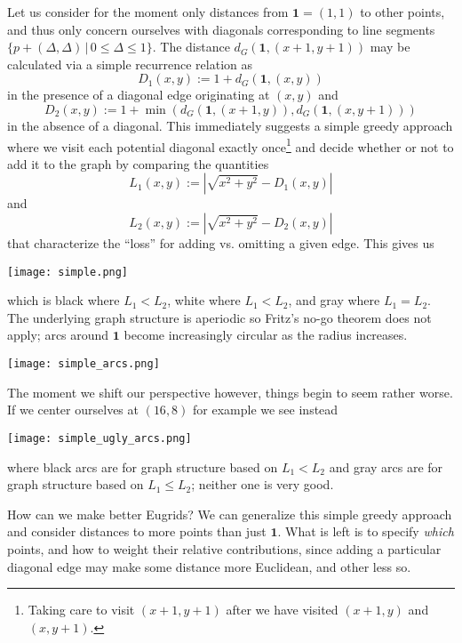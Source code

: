 \documentclass[letterpaper]{article}
\begin{document}
Let us consider for the moment only distances from $\mathbf{1} = (1, 1)$ to other points, and
thus only concern ourselves with diagonals corresponding to line segments $\{p + (\Delta,
\Delta) \, | \, 0 \leq \Delta \leq 1\}$. The distance $d_G(\mathbf{1}, (x+1, y+1))$ may be
calculated via a simple recurrence relation as
\begin{equation*}
  D_1(x, y) := 1 + d_G(\mathbf{1}, (x, y))
\end{equation*}
in the presence of a diagonal edge originating at $(x, y)$ and
\begin{equation*}
  D_2(x, y) := 1 + \min(d_G(\mathbf{1}, (x + 1, y)), d_G(\mathbf{1}, (x, y + 1)))
\end{equation*}
in the absence of a diagonal. This immediately suggests a simple greedy approach where we
visit each potential diagonal exactly once\footnote{Taking care to visit $(x+1, y+1)$ after
we have visited $(x+1,y)$ and $(x,y+1)$.} and decide whether or not to add it to the graph by
comparing the quantities
\begin{equation*}
  L_1(x, y) := |\sqrt{x^2 + y^2} - D_1(x, y)|
\end{equation*}
and
\begin{equation*}
  L_2(x, y) := |\sqrt{x^2 + y^2} - D_2(x, y)|
\end{equation*}
that characterize the ``loss'' for adding vs. omitting a given edge. This gives us
\begin{center}
  \texttt{[image: simple.png]}
\end{center}
which is black where $L_1 < L_2$, white where $L_1 < L_2$, and gray where $L_1 = L_2$. The
underlying graph structure is aperiodic so Fritz's no-go theorem does not apply; arcs around
$\mathbf{1}$ become increasingly circular as the radius increases.
\begin{center}
  \texttt{[image: simple\_arcs.png]}
\end{center}

The moment we shift our perspective however, things begin to seem rather worse. If we center
ourselves at $(16, 8)$ for example we see instead
\begin{center}
  \texttt{[image: simple\_ugly\_arcs.png]}
\end{center}
where black arcs are for graph structure based on $L_1 < L_2$ and gray arcs are for graph
structure based on $L_1 \leq L_2$; neither one is very good.

How can we make better Eugrids? We can generalize this simple greedy approach and consider
distances to more points than just $\mathbf{1}$. What is left is to specify \emph{which}
points, and how to weight their relative contributions, since adding a particular diagonal
edge may make some distance more Euclidean, and other less so.
\end{document}

